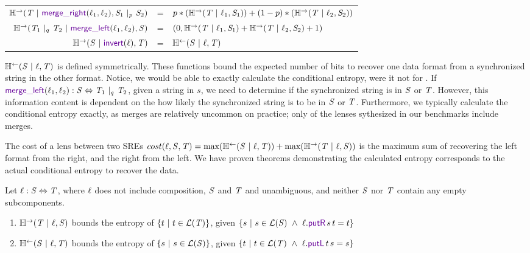 \documentclass[acmsmall,screen,anonymous]{acmart}
\begin{document}
\begin{center}
\begin{tabular}{rcl}
    $\REntropyOf{\RegexAlt \Given \MergeROf{\Lens_1}{\Lens_2}, \PRegexOr{\Regex_1}{\Regex_2}{\Probability}}$
    & =
    & $p*(\mathbb{H}^\rightarrow(\mathit{T} ~|~ \mathit{\ell}_1, \mathit{S}_1)) + (1-p)*(\mathbb{H}^\rightarrow(\mathit{T} ~|~ \mathit{\ell}_2, \mathit{S}_2))$\\
    
    $\REntropyOf{\PRegexOr{\RegexAlt_1}{\RegexAlt_2}{\ProbabilityAlt} \Given \MergeLOf{\Lens_1}{\Lens_2}, \Regex}$
    & =
    & $(0,\mathbb{H}^\rightarrow(\mathit{T} ~|~ \mathit{\ell}_1, \mathit{S}_1)+\mathbb{H}^\rightarrow(\mathit{T} ~|~ \mathit{\ell}_2, \mathit{S}_2)+1)$\\
    
    $\REntropyOf{\Regex \Given \InvertOf{\Lens}, \RegexAlt}$
    & =
    & $\mathbb{H}^\leftarrow(\mathit{S} ~|~ \mathit{\ell}, \mathit{T})$\\
  \end{tabular}
\end{center}
$\mathbb{H}^\leftarrow(\mathit{S} ~|~ \mathit{\ell}, \mathit{T})$ is defined symmetrically. These
functions bound the expected number of bits to recover one data format from a
synchronized string in the other format. Notice, we would be able to exactly
calculate the conditional entropy, were it not for \MergeL. If
$\MergeLOf{\Lens_1}{\Lens_2} \OfType \Regex \Leftrightarrow
\PRegexOr{\RegexAlt_1}{\RegexAlt_2}{\ProbabilityAlt}$, given a string in $s$, we
need to determine if the synchronized string is in $\mathit{S}$ or $\mathit{T}$.
However, this information content is dependent on the how likely the
synchronized string is to be in $\mathit{S}$ or $\mathit{T}$. Furthermore, we
typically calculate the conditional entropy exactly, as merges are relatively
uncommon on practice; only  of the lenses sythesized in our benchmarks
include merges.

The cost of a lens between two SREs $cost(\mathit{\ell}, \mathit{S}, \mathit{T}) =
\text{max}(\mathbb{H}^\leftarrow(\mathit{S} ~|~ \mathit{\ell}, \mathit{T})) +
\text{max}(\mathbb{H}^\rightarrow(\mathit{T} ~|~ \mathit{\ell}, \mathit{S}))$ is the maximum sum of
recovering the left format from the right, and the right from the left. We have
proven theorems demonstrating the calculated entropy corresponds to the actual
conditional entropy to recover the data.

\begin{theorem}
  Let $\mathit{\ell} : \mathit{S} \Leftrightarrow \mathit{T}$, where $\mathit{\ell}$ does not
  include composition, $\mathit{S}$ and $\mathit{T}$ and unambiguous, and neither
  $\mathit{S}$ nor $\mathit{T}$ contain any empty subcomponents.
  \begin{enumerate}
  \item $\mathbb{H}^\rightarrow(\mathit{T} ~|~ \mathit{\ell}, \mathit{S})$ bounds the entropy of
    $\{t ~|~ t \in \mathcal{L}(\mathit{T})\}$, given $\SetOf{s
      \SuchThat s \in \LanguageOf{\Regex} \BooleanAnd \Lens.\PutROf{s}{t} = t}$
  \item $\mathbb{H}^\leftarrow(\mathit{S} ~|~ \mathit{\ell}, \mathit{T})$ bounds the entropy of
    $\{s ~|~ s \in \mathcal{L}(\mathit{S})\}$, given $\SetOf{t \SuchThat t
      \in \LanguageOf{\RegexAlt} \BooleanAnd \Lens.\PutLOf{t}{s} = s}$
  \end{enumerate}
\end{theorem}
\end{document}
